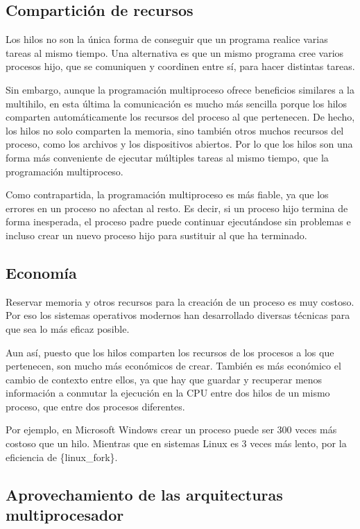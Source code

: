 \subsection{Compartición de
recursos}\label{_comparticiuxf3n_de_recursos}

Los hilos no son la única forma de conseguir que un programa realice
varias tareas al mismo tiempo. Una alternativa es que un mismo programa
cree varios procesos hijo, que se comuniquen y coordinen entre sí, para
hacer distintas tareas.

Sin embargo, aunque la programación multiproceso ofrece beneficios
similares a la multihilo, en esta última la comunicación es mucho más
sencilla porque los hilos comparten automáticamente los recursos del
proceso al que pertenecen. De hecho, los hilos no solo comparten la
memoria, sino también otros muchos recursos del proceso, como los
archivos y los dispositivos abiertos. Por lo que los hilos son una forma
más conveniente de ejecutar múltiples tareas al mismo tiempo, que la
programación multiproceso.

Como contrapartida, la programación multiproceso es más fiable, ya que
los errores en un proceso no afectan al resto. Es decir, si un proceso
hijo termina de forma inesperada, el proceso padre puede continuar
ejecutándose sin problemas e incluso crear un nuevo proceso hijo para
sustituir al que ha terminado.

\subsection{Economía}\label{_economuxeda}

Reservar memoria y otros recursos para la creación de un proceso es muy
costoso. Por eso los sistemas operativos modernos han desarrollado
diversas técnicas para que sea lo más eficaz posible.

Aun así, puesto que los hilos comparten los recursos de los procesos a
los que pertenecen, son mucho más económicos de crear. También es más
económico el cambio de contexto entre ellos, ya que hay que guardar y
recuperar menos información a conmutar la ejecución en la CPU entre dos
hilos de un mismo proceso, que entre dos procesos diferentes.

Por ejemplo, en Microsoft Windows crear un proceso puede ser 300 veces
más costoso que un hilo. Mientras que en sistemas Linux es 3 veces más
lento, por la eficiencia de \{linux\_fork\}.

\subsection{Aprovechamiento de las arquitecturas
multiprocesador}\label{_aprovechamiento_de_las_arquitecturas_multiprocesador}

